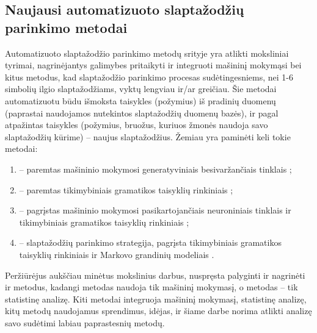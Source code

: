 \documentclass{VUMIFInfBakalaurinis}
\begin{document}
\subsection{Naujausi automatizuoto slaptažodžių parinkimo metodai}
Automatizuoto slaptažodžio parinkimo metodų srityje yra atlikti moksliniai 
tyrimai, nagrinėjantys galimybes pritaikyti ir integruoti mašininį mokymąsi bei 
kitus metodus, kad slaptažodžio parinkimo procesas sudėtingesniems, nei 1-6 
simbolių ilgio slaptažodžiams, vyktų lengviau ir/ar greičiau. Šie metodai 
automatizuotu būdu išmoksta taisykles (požymius) iš pradinių duomenų (paprastai 
naudojamos nutekintos slaptažodžių duomenų bazės), ir pagal atpažintas
taisykles (požymius, bruožus, kuriuos žmonės naudoja savo slaptažodžių kūrime) 
-- naujus slaptažodžius. Žemiau yra paminėti keli tokie metodai:
\begin{enumerate}
  \item {} -- paremtas mašininio mokymosi generatyviniais 
    besivaržančiais tinklais \cite{PassGAN};
  \item {} -- paremtas tikimybiniais gramatikos taisyklių 
    rinkiniais \cite{PCFG1,PCFG2};
  \item {} -- pagrįstas mašininio mokymosi pasikartojančiais 
    neuroniniais tinklais ir tikimybiniais gramatikos taisyklių rinkiniais 
    \cite{GenPASS};
  \item {} -- slaptažodžių parinkimo strategija, pagrįsta 
    tikimybiniais gramatikos taisyklių rinkiniais ir Markovo grandinių modeliais 
    \cite{TG-SPSR}.
\end{enumerate}

Peržiūrėjus aukščiau minėtus mokslinius darbus, nuspręsta palyginti ir nagrinėti 
 ir  metodus, kadangi  
metodas naudoja tik mašininį mokymasį, o  metodas -- tik 
statistinę analizę. Kiti metodai integruoja mašininį mokymasį, statistinę 
analizę, kitų metodų naudojamus sprendimus, idėjas, ir šiame darbe norima 
atlikti analizę savo sudėtimi labiau paprastesnių metodų.


\end{document}
